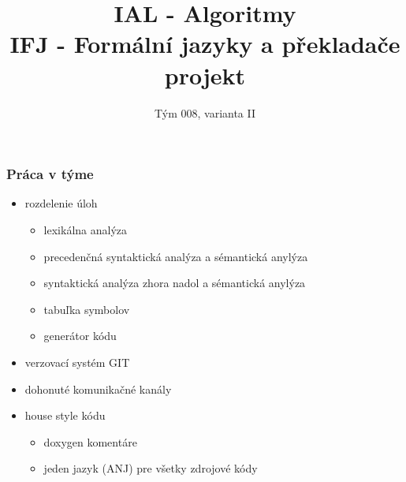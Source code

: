 \documentclass[usenames,dvipsnames]{beamer}
\title{IAL - Algoritmy \\
IFJ - Formální jazyky a překladače \\
projekt}
\subtitle{Tým 008, varianta II}
\date{}
\begin{document}
\begin{frame}
\maketitle
\begin{table}[H]
	\Large
	\centering
\end{table}
\end{frame}

\begin{frame}
	\frametitle{Práca v týme}
	\begin{itemize}
		\item rozdelenie úloh
		\begin{itemize}
			\item lexikálna analýza
			\item precedenčná syntaktická analýza a sémantická anylýza
			\item syntaktická analýza zhora nadol a sémantická anylýza
			\item tabuľka symbolov
			\item generátor kódu
		\end{itemize}
		\item verzovací systém GIT
		\item dohonuté komunikačné kanály
		\item house style kódu
		\begin{itemize}
			\item doxygen komentáre
			\item jeden jazyk (ANJ) pre všetky zdrojové kódy
		\end{itemize}
	\end{itemize}
\end{frame}
\end{document}
